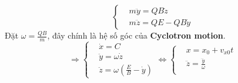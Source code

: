\begin{enumerate}
\begin{enumerate}
\[\begin{cases}
&m\ddot{y} =QB\dot{z} \\[6pt]

&m\ddot{z} = QE -QB\dot{y}
\end{cases}
\]
Đặt $\omega = \frac{QB}{m}$, đây chính là hệ số góc của \textbf{Cyclotron motion}.
\[
\Rightarrow
\begin{cases}
&\dot{x} = C \\[6pt]

&\ddot{y} =\omega\dot{z} \\[6pt]

&\ddot{z} = \omega(\frac{E}{B}-\dot{y})
\end{cases}
\Leftrightarrow
\begin{cases}
&x = x_{0} + v_{x0}t \\[6pt]

&\ddot{z} = \frac{\dddot{y}}{\omega}\\[6pt]


\end{cases}\]
\end{enumerate}
\end{enumerate}
